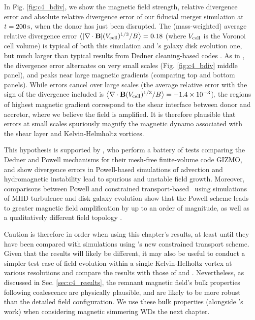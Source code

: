 In Fig. \ref{fig:c4_bdiv}, we show the magnetic field strength, relative divergence error and absolute relative divergence error of our fiducial merger simulation at $t = 200\,\mathrm{s}$, when the donor has just been disrupted.  The (mass-weighted) average relative divergence error $\left\langle|\mathbf{\nabla\cdot B}|(V_\mathrm{cell})^{1/3}/B\right\rangle = 0.18$ (where $V_\mathrm{cell}$ is the Voronoi cell volume) is typical of both this simulation and \cite{pakms13}'s galaxy disk evolution one, but much larger than typical results from Dedner cleaning-based codes \citep{tric15, hopkr16}.  As in \cite{pakms13}, the divergence error alternates on very small scales (Fig. \ref{fig:c4_bdiv} middle panel), and peaks near large magnetic gradients (comparing top and bottom panels).  While errors cancel over large scales (the average relative error with the sign of the divergence included is $\left\langle\mathbf{\nabla\cdot B}(V_\mathrm{cell})^{1/3}/B\right\rangle = -1.4\times10^{-3}$), the regions of highest magnetic gradient correspond to the shear interface between donor and accretor, where we believe the field is amplified.  It is therefore plausible that errors at small scales spuriously magnify the magnetic dynamo associated with the shear layer and Kelvin-Helmholtz vortices.  

This hypothesis is supported by \cite{hopkr16}, who perform a battery of tests comparing the Dedner and Powell mechanisms for their mesh-free finite-volume code \textsc{GIZMO}, and show divergence errors in Powell-based simulations of advection and hydromagnetic instability lead to spurious and unstable field growth.  Moreover, comparisons between Powell and constrained transport-based \arepo\ using simulations of MHD turbulence and disk galaxy evolution show that the Powell scheme leads to greater magnetic field amplification by up to an order of magnitude, as well as a qualitatively different field topology \citep{mocz+16}.



Caution is therefore in order when using this chapter's results, at least until they have been compared with simulations using \arepo's new constrained transport scheme.  Given that the results will likely be different, it may also be useful to conduct a simpler test case of field evolution within a single Kelvin-Helholtz vortex at various resolutions and compare the results with those of \cite{oberam10} and \cite{zrakm13}.  Nevertheless, as discussed in Sec. \ref{sec:c4_results}, the remnant magnetic field's bulk properties following coalescence are physically plausible, and are likely to be more robust than the detailed field configuration.  We use these bulk properties (alongside \cite{ji+13}'s work) when considering magnetic simmering WDs the next chapter.

